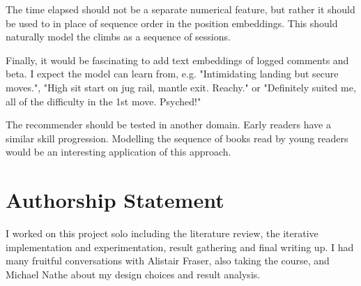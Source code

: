 \documentclass[10pt]{article}
\begin{document}
The time elapsed should not be a separate numerical feature, but rather it should be used to in place of sequence order in the position embeddings. This should naturally model the climbs as a sequence of sessions. 

Finally, it would be fascinating to add text embeddings of logged comments and beta. I expect the model can learn from, e.g. "Intimidating landing but secure moves.", "High sit start on jug rail, mantle exit. Reachy." or "Definitely suited me, all of the difficulty in the 1st move. Psyched!"

The recommender should be tested in another domain. Early readers have a similar skill progression. Modelling the sequence of books read by young readers would be an interesting application of this approach.


\section*{Authorship Statement}

I worked on this project solo including the literature review, the iterative implementation and experimentation, result gathering and final writing up. I had many fruitful conversations with Alistair Fraser, also taking the course, and Michael Nathe about my design choices and result analysis. 





\end{document}
